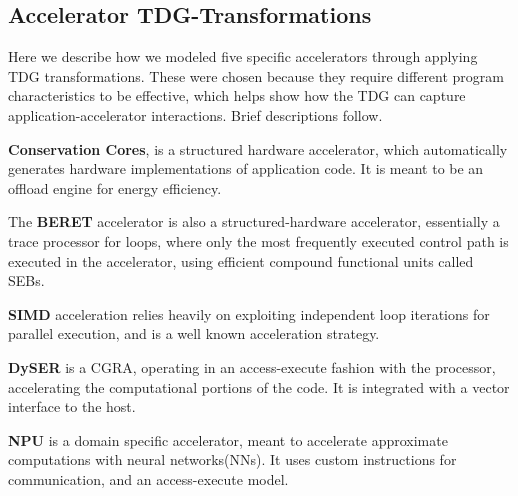  
\subsection{Accelerator TDG-Transformations} \label{sec:trans}

Here we describe how we modeled five specific accelerators through
applying TDG transformations.  These were chosen because they require
different program characteristics to be effective, which helps show how the TDG
can capture application-accelerator interactions.  Brief descriptions follow.

\textbf{Conservation Cores}, is a structured hardware accelerator,
which automatically generates hardware implementations of application code.
It is meant to be an offload engine for energy efficiency.  

The \textbf{BERET} accelerator is also a structured-hardware accelerator,
essentially a trace processor for loops, where only the most frequently 
executed control path is executed in the accelerator, using efficient compound
functional units called SEBs.

\textbf{SIMD} acceleration relies heavily on exploiting independent loop iterations for
parallel execution, and is a well known acceleration strategy.  

\textbf{DySER} is a CGRA, operating in an access-execute fashion with the 
processor, accelerating the computational portions of the code.  
It is integrated with a vector interface to the host.

\textbf{NPU} is a domain specific accelerator, meant to accelerate approximate
computations with neural networks(NNs).  It uses custom instructions for communication,
and an access-execute model. 

